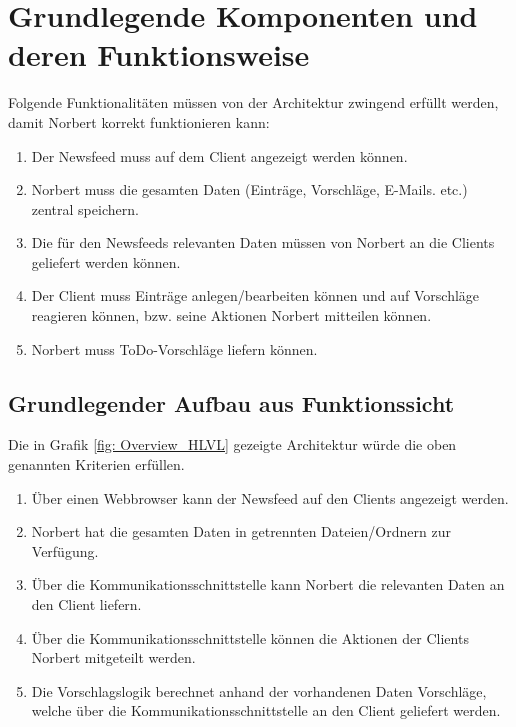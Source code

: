 
\chapter{Grundlegende Komponenten und deren Funktionsweise}

Folgende Funktionalitäten müssen von der Architektur zwingend erfüllt werden, damit Norbert korrekt funktionieren kann:
\begin{enumerate}
	\item Der Newsfeed muss auf dem Client angezeigt werden können.
	\item Norbert muss die gesamten Daten (Einträge, Vorschläge, E-Mails. etc.) zentral speichern.
	\item Die für den Newsfeeds relevanten Daten müssen von Norbert an die Clients geliefert werden können.
	\item Der Client muss Einträge anlegen/bearbeiten können und auf Vorschläge reagieren können, bzw. seine Aktionen Norbert mitteilen können.
	\item Norbert muss ToDo-Vorschläge liefern können.
\end{enumerate}
 


\section[Grundlegender Aufbau]{Grundlegender Aufbau aus Funktionssicht}


  Die in Grafik \ref{fig: Overview_HLVL} gezeigte Architektur würde die oben genannten Kriterien erfüllen.
  \begin{enumerate}
  	\item Über einen Webbrowser kann der Newsfeed auf den Clients angezeigt werden.
  	\item Norbert hat die gesamten Daten in getrennten Dateien/Ordnern zur Verfügung.
  	\item Über die Kommunikationsschnittstelle kann Norbert die relevanten Daten an den Client liefern.
  	\item Über die Kommunikationsschnittstelle können die Aktionen der Clients Norbert mitgeteilt werden.
  	\item Die Vorschlagslogik berechnet anhand der vorhandenen Daten Vorschläge, welche über die Kommunikationsschnittstelle an den Client geliefert werden.
  	\end{enumerate}

